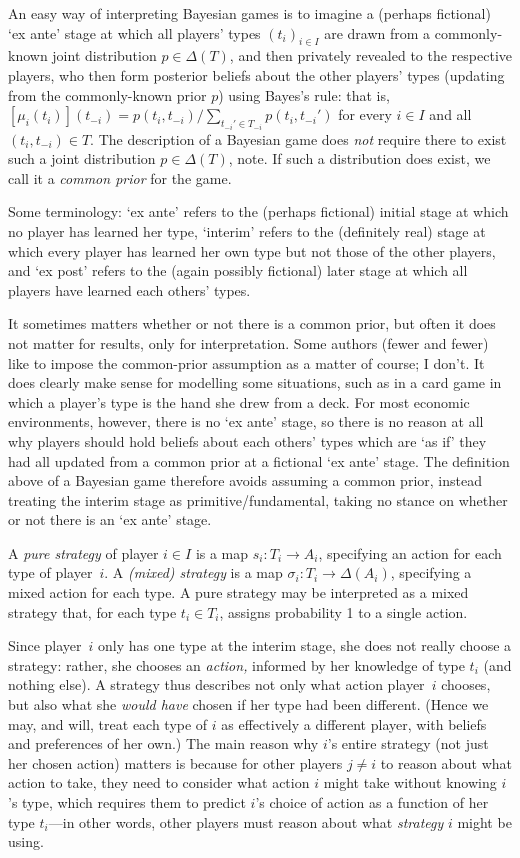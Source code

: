 \documentclass[11pt,letterpaper,reqno,oneside]{book}
\begin{document}
An easy way of interpreting Bayesian games is to imagine a (perhaps fictional) `ex ante' stage at which all players' types $(t_i)_{i \in I}$ are drawn from a commonly-known joint distribution $p \in \Delta(T)$, and then privately revealed to the respective players, who then form posterior beliefs about the other players' types (updating from the commonly-known prior $p$) using Bayes's rule: that is, $[\mu_i(t_i)](t_{-i}) = p(t_i,t_{-i}) / \sum_{t_{-i}' \in T_{-i}} p(t_i,t_{-i}')$ for every $i \in I$ and all $(t_i,t_{-i}) \in T$. The description of a Bayesian game does \emph{not} require there to exist such a joint distribution $p \in \Delta(T)$, note. If such a distribution does exist, we call it a \emph{common prior} for the game.

Some terminology: `ex ante' refers to the (perhaps fictional) initial stage at which no player has learned her type, `interim' refers to the (definitely real) stage at which every player has learned her own type but not those of the other players, and `ex post' refers to the (again possibly fictional) later stage at which all players have learned each others' types.

It sometimes matters whether or not there is a common prior, but often it does not matter for results, only for interpretation. Some authors (fewer and fewer) like to impose the common-prior assumption as a matter of course; I don't. It does clearly make sense for modelling some situations, such as in a card game in which a player's type is the hand she drew from a deck. For most economic environments, however, there is no `ex ante' stage, so there is no reason at all why players should hold beliefs about each others' types which are `as if' they had all updated from a common prior at a fictional `ex ante' stage. The definition above of a Bayesian game therefore avoids assuming a common prior, instead treating the interim stage as primitive/fundamental, taking no stance on whether or not there is an `ex ante' stage.

A \emph{pure strategy} of player $i \in I$ is a map $s_i : T_i \to A_i$, specifying an action for each type of player~$i$. A \emph{(mixed) strategy} is a map $\sigma_i : T_i \to \Delta(A_i)$, specifying a mixed action for each type. A pure strategy may be interpreted as a mixed strategy that, for each type $t_i \in T_i$, assigns probability 1 to a single action.

Since player~$i$ only has one type at the interim stage, she does not really choose a strategy: rather, she chooses an \emph{action,} informed by her knowledge of type $t_i$ (and nothing else). A strategy thus describes not only what action player~$i$ chooses, but also what she \emph{would have} chosen if her type had been different. (Hence we may, and will, treat each type of $i$ as effectively a different player, with beliefs and preferences of her own.) The main reason why $i$'s entire strategy (not just her chosen action) matters is because for other players $j \neq i$ to reason about what action to take, they need to consider what action $i$ might take without knowing $i$'s type, which requires them to predict $i$'s choice of action as a function of her type $t_i$---in other words, other players must reason about what \emph{strategy} $i$ might be using.
\end{document}
